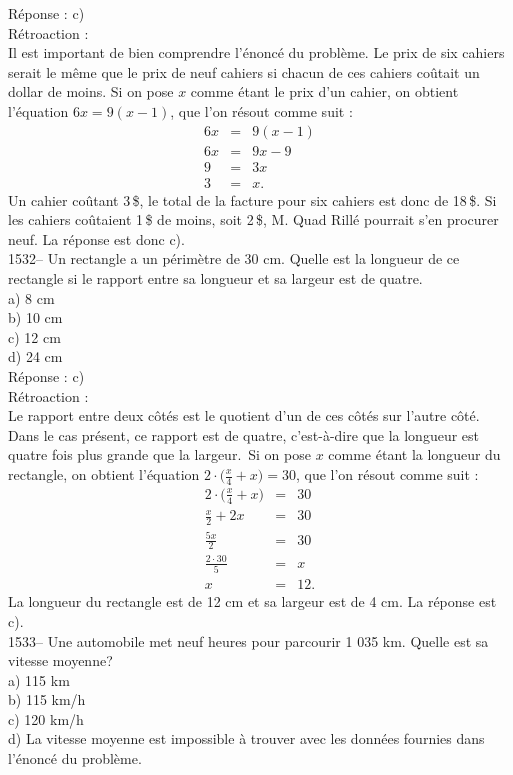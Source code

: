 R\'eponse : c)\\

R\'etroaction :\\
Il est important de bien comprendre l'\'enonc\'e du probl\`eme. Le
prix de six cahiers serait le m\^eme que le prix de neuf cahiers si
chacun de ces cahiers co\^utait un dollar de moins. Si on pose $x$
comme \'etant le prix d'un cahier, on obtient l'\'equation
$6x=9(x-1)$, que l'on r\'esout comme suit :
\begin{eqnarray*}
6x&=&9(x-1)  \\ 6x&=&9x-9  \\ 9&=&3x  \\  3&=& x.
\end{eqnarray*}
Un cahier co\^utant 3\,\$, le total de la facture pour six cahiers
est donc de 18\,\$. Si les cahiers co\^utaient 1\,\$ de moins, soit
2\,\$, M. Quad Rill\'e pourrait s'en
procurer neuf. La r\'eponse est donc c).\\

1532-- Un rectangle a un p\'erim\`etre de 30 cm. Quelle est la
longueur de ce rectangle si le rapport entre sa longueur et sa
largeur est de quatre. \\
a) 8 cm\\
b) 10 cm\\
c) 12 cm\\
d) 24 cm\\

R\'eponse : c)\\

R\'etroaction :\\
Le rapport entre deux c\^ot\'es est le quotient d'un de ces
c\^ot\'es sur l'autre c\^ot\'e. Dans le cas pr\'esent, ce rapport
est de quatre, c'est-\`a-dire que la longueur est quatre fois plus
grande que la largeur. \,Si on pose $x$ comme \'etant la longueur du
rectangle, on obtient l'\'equation
$2\cdot\Big(\frac{x}{4}+x\Big)=30$, que l'on r\'esout comme suit :
\begin{eqnarray*}
2\cdot\Big(\frac{x}{4}+x\Big)&=&30  \\[3mm] \frac{x}{2}+2x&=&30
\\
\frac{5x}{2}&=&30  \\[3mm] \frac{2\cdot 30}{5}&=&x \\[3mm] x&=&12.
\end{eqnarray*}
La longueur du rectangle est de 12 cm et sa largeur est de 4
cm. La r\'eponse est c). \\

1533-- Une automobile met neuf heures pour parcourir {\textrm{1 035
}}km. Quelle
est sa vitesse moyenne?\\
a) 115 km\\
b) 115 km/h\\
c) 120 km/h\\
d) La vitesse moyenne est impossible \`a trouver avec
les donn\'ees fournies dans l'\'enonc\'e du probl\`eme.\\

